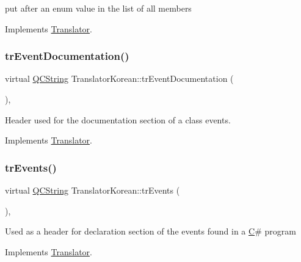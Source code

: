 put after an enum value in the list of all members 

Implements \mbox{\hyperlink{class_translator}{Translator}}.

\mbox{\label{class_translator_korean_a9b93b09881dae65623c1c5c562462aff}} 
\subsubsection{\texorpdfstring{trEventDocumentation()}{trEventDocumentation()}}
{\footnotesize\ttfamily virtual \mbox{\hyperlink{class_q_c_string}{Q\+C\+String}} Translator\+Korean\+::tr\+Event\+Documentation (\begin{DoxyParamCaption}{ }\end{DoxyParamCaption})\hspace{0.3cm}{\ttfamily [inline]}, {\ttfamily [virtual]}}

Header used for the documentation section of a class\textquotesingle{} events. 

Implements \mbox{\hyperlink{class_translator}{Translator}}.

\mbox{\label{class_translator_korean_af3d6f5fd9b0c11943c05f231ad03c150}} 
\subsubsection{\texorpdfstring{trEvents()}{trEvents()}}
{\footnotesize\ttfamily virtual \mbox{\hyperlink{class_q_c_string}{Q\+C\+String}} Translator\+Korean\+::tr\+Events (\begin{DoxyParamCaption}{ }\end{DoxyParamCaption})\hspace{0.3cm}{\ttfamily [inline]}, {\ttfamily [virtual]}}

Used as a header for declaration section of the events found in a \mbox{\hyperlink{class_c}{C}}\# program 

Implements \mbox{\hyperlink{class_translator}{Translator}}.

\mbox{\label{class_translator_korean_a4824f5f504a44deb5f0a222ef112e381}} 
